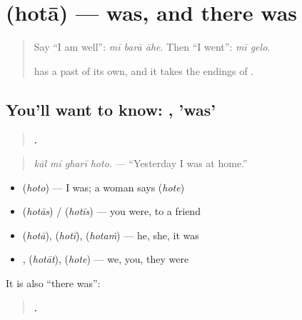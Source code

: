 \section[\texorpdfstring{\mr{होता} (hotā)}{होता (hotā)}]{ (hotā) — was, and there was}

\label{lesson:MR-C276-hota}



\begin{quote}
Say \textquotedblleft{}I am well\textquotedblright{}: \emph{mī barā āhe}. Then \textquotedblleft{}I went\textquotedblright{}: \emph{mī gelo}.

\textbf{} has a past of its own, and it takes the endings of \textbf{}.
\end{quote}

\subsection*{You'll want to know: , 'was'}
\begin{quote}
\textbf{   .}
\end{quote}

\begin{quote}
\emph{kāl mī gharī hoto.} — \textquotedblleft{}Yesterday I was at home.\textquotedblright{}
\end{quote}

\begin{itemize}
\raggedright
  \item \textbf{} \textbf{} (\emph{hoto}) — I was; a woman says \textbf{} (\emph{hote})
  \item \textbf{} \textbf{} (\emph{hotās}) / \textbf{} (\emph{hotīs}) — you were, to a friend
  \item \textbf{} \textbf{} (\emph{hotā}), \textbf{} \textbf{} (\emph{hotī}), \textbf{} \textbf{} (\emph{hotaṁ}) — he, she, it was
  \item \textbf{} \textbf{}, \textbf{} \textbf{} (\emph{hotāt}), \textbf{} \textbf{} (\emph{hote}) — we, you, they were
\end{itemize}

It is also \textquotedblleft{}there was\textquotedblright{}:

\begin{quote}
\textbf{   .}
\end{quote}

